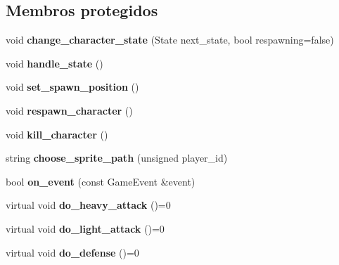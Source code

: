 \subsection*{Membros protegidos}
\begin{DoxyCompactItemize}
\item 
\mbox{\label{classCharacter_a067f09af5430da58cc9698421fb84814}} 
void {\bfseries change\+\_\+character\+\_\+state} (State next\+\_\+state, bool respawning=false)
\item 
\mbox{\label{classCharacter_a2edbbba1c9e07eece34c25f651e364d9}} 
void {\bfseries handle\+\_\+state} ()
\item 
\mbox{\label{classCharacter_a75f825ad6509fa1601d2e2bc2ac04b3c}} 
void {\bfseries set\+\_\+spawn\+\_\+position} ()
\item 
\mbox{\label{classCharacter_afc90256ef2253670aee9def34f700247}} 
void {\bfseries respawn\+\_\+character} ()
\item 
\mbox{\label{classCharacter_adb0d4f9c0ebbc0f9b19cb0a1f4b20df7}} 
void {\bfseries kill\+\_\+character} ()
\item 
\mbox{\label{classCharacter_a5277e58a7a52a99a42bdb23c6295c7f1}} 
string {\bfseries choose\+\_\+sprite\+\_\+path} (unsigned player\+\_\+id)
\item 
\mbox{\label{classCharacter_a92d3a1ad2ceba203bf72584c4c4029d7}} 
bool {\bfseries on\+\_\+event} (const Game\+Event \&event)
\item 
\mbox{\label{classCharacter_aa9b20c9c53393c7aaf3a45e5c966c2ef}} 
virtual void {\bfseries do\+\_\+heavy\+\_\+attack} ()=0
\item 
\mbox{\label{classCharacter_ae45be8b8b1a7d2f54a2349a65e2e6c42}} 
virtual void {\bfseries do\+\_\+light\+\_\+attack} ()=0
\item 
\mbox{\label{classCharacter_ad8a87c4397e38fd4bd88c93a3d3cb70a}} 
virtual void {\bfseries do\+\_\+defense} ()=0
\item 

\end{DoxyCompactItemize}
